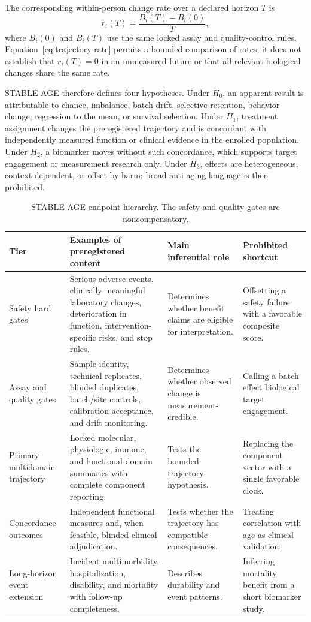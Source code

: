 \documentclass[10pt,conference]{IEEEtran}
\begin{document}
The corresponding within-person change rate over a declared horizon $T$ is
\begin{equation}
r_i(T)=\frac{B_i(T)-B_i(0)}{T},
\label{eq:trajectory-rate}
\end{equation}
where $B_i(0)$ and $B_i(T)$ use the same locked assay and quality-control rules. Equation~\eqref{eq:trajectory-rate} permits a bounded comparison of rates; it does not establish that $r_i(T)=0$ in an unmeasured future or that all relevant biological changes share the same rate.

STABLE-AGE therefore defines four hypotheses. Under $H_0$, an apparent result is attributable to chance, imbalance, batch drift, selective retention, behavior change, regression to the mean, or survival selection. Under $H_1$, treatment assignment changes the preregistered trajectory and is concordant with independently measured function or clinical evidence in the enrolled population. Under $H_2$, a biomarker moves without such concordance, which supports target engagement or measurement research only. Under $H_3$, effects are heterogeneous, context-dependent, or offset by harm; broad anti-aging language is then prohibited.

\begin{table}[!t]
\caption{STABLE-AGE endpoint hierarchy. The safety and quality gates are noncompensatory.}
\label{tab:endpoint-hierarchy}
\centering
\footnotesize
\begin{tabular}{@{}p{}p{}p{}p{}@{}}
\toprule
Tier & Examples of preregistered content & Main inferential role & Prohibited shortcut \\
\midrule
Safety hard gates & Serious adverse events, clinically meaningful laboratory changes, deterioration in function, intervention-specific risks, and stop rules. & Determines whether benefit claims are eligible for interpretation. & Offsetting a safety failure with a favorable composite score. \\
Assay and quality gates & Sample identity, technical replicates, blinded duplicates, batch/site controls, calibration acceptance, and drift monitoring. & Determines whether observed change is measurement-credible. & Calling a batch effect biological target engagement. \\
Primary multidomain trajectory & Locked molecular, physiologic, immune, and functional-domain summaries with complete component reporting. & Tests the bounded trajectory hypothesis. & Replacing the component vector with a single favorable clock. \\
Concordance outcomes & Independent functional measures and, when feasible, blinded clinical adjudication. & Tests whether the trajectory has compatible consequences. & Treating correlation with age as clinical validation. \\
Long-horizon event extension & Incident multimorbidity, hospitalization, disability, and mortality with follow-up completeness. & Describes durability and event patterns. & Inferring mortality benefit from a short biomarker study. \\
\bottomrule
\end{tabular}
\end{table}
\end{document}
